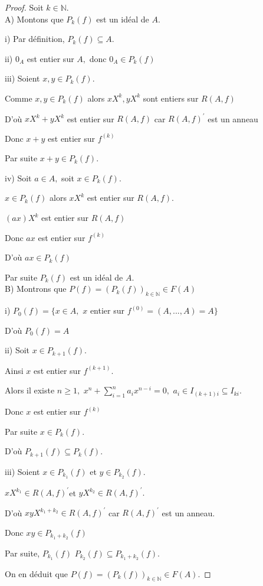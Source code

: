 \begin{proof}
	Soit $k\in \mathbb{N}.$ \\
	A) Montons que $P_{k}(f)$ est un idéal de $A$.
	
	i) Par définition, $P_{k}(f)\subseteq A.$
	
	ii) $0_{A}$ est entier sur $A,$ donc $0_{A}\in P_{k}(f)$
	
	iii) Soient $x,y\in P_{k}(f).$
	
	Comme $x,y\in P_{k}(f)$ alors $xX^{k},yX^{k}$ sont entiers sur $R(A,f)$
	
	D'où $xX^{k}+yX^{k}$ est entier sur $R(A,f)$ car $R(A,f)^{\prime }$ est
	un anneau
	
	Donc $x+y$ est entier sur $f^{(k)}$
	
	Par suite $x+y\in P_{k}(f).$
	
	iv) Soit $a\in A,$ soit $x\in P_{k}(f).$
	
	$x\in P_{k}(f)$ alors $xX^{k}$ est entier sur $R(A,f).$
	
	$(ax)X^{k}$ est entier sur $R(A,f)$
	
	Donc $ax$ est entier sur $f^{(k)}$
	
	D'où $ax\in P_{k}(f)$
	
	Par suite $P_{k}(f)$ est un idéal de $A.$ \\
	B) Montrons que $P(f)=(P_{k}(f))_{k\in \mathbb{N}}\in F(A)$
	
	i) $P_{0}(f)=\{x\in A,$ $x$ entier sur $f^{(0)}=(A,...,A)=A\}$
	
	D'où $P_{0}(f)=A$
	
	ii) Soit $x\in P_{k+1}(f).$
	
	Ainsi $x$ est entier sur $f^{(k+1)}.$
	
	Alors il existe $n\geq 1,$ $x^{n}+\sum\limits_{i=1}^{n}a_{i}x^{n-i}=0,$ $%
	a_{i}\in I_{(k+1)i}\subseteq I_{ki}$.
	
	Donc $x$ est entier sur $f^{(k)}$
	
	Par suite $x\in P_{k}(f).$
	
	D'où $P_{k+1}(f)\subseteq P_{k}(f).$
	
	iii) Soient $x\in P_{k_{1}}(f)$ et $y\in P_{k_{2}}(f)$.
	
	$xX^{k_{1}}\in R(A,f)^{\prime }$et $yX^{k_{2}}\in R(A,f)^{\prime }.$
	
	D'où $xyX^{k_{1}+k_{2}}\in R(A,f)^{\prime }$ car $R(A,f)^{\prime }$ est
	un anneau.
	
	Donc $xy\in P_{k_{1}+k_{2}}(f)$
	
	Par suite, $P_{k_{1}}(f)$ $P_{k_{2}}(f)\subseteq P_{k_{1}+k_{2}}(f).$
	
	On en déduit que $P(f)=(P_{k}(f))_{k\in \mathbb{N}}\in F(A).$
\end{proof}
